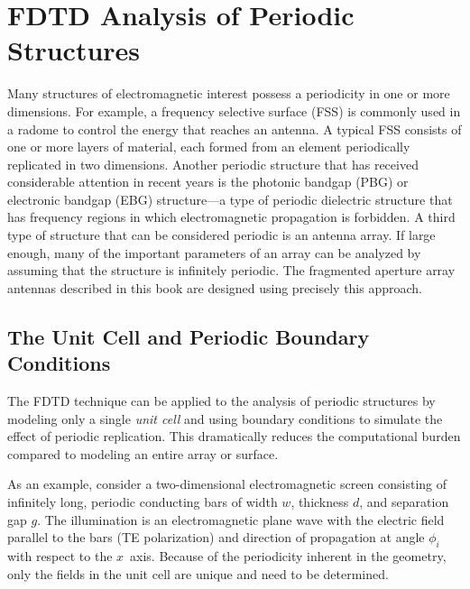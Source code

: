 \section{FDTD Analysis of Periodic Structures}
\label{sec:FDTD_PBC}

Many structures of electromagnetic interest possess a periodicity in one or more dimensions.  For example, a frequency selective surface (FSS) is commonly used in a radome to control the energy that reaches an antenna.  A typical FSS consists of one or more layers of material, each formed from an element periodically replicated in two dimensions.  Another periodic structure that has received considerable attention in recent years is the photonic bandgap (PBG) or electronic bandgap (EBG) structure---a type of periodic dielectric structure that has frequency regions in which electromagnetic propagation is forbidden.  A third type of structure that can be considered periodic is an antenna array.  If large enough, many of the important parameters of an array can be analyzed by assuming that the structure is infinitely periodic.  The fragmented aperture array antennas described in this book are designed using precisely this approach.

\subsection{The Unit Cell and Periodic Boundary Conditions}

The FDTD technique can be applied to the analysis of periodic structures by modeling only a single \emph{unit cell} and using boundary conditions to simulate the effect of periodic replication.  This dramatically reduces the computational burden compared to modeling an entire array or surface.

As an example, consider a two-dimensional electromagnetic screen consisting of infinitely long, periodic conducting bars of width $w$, thickness $d$, and separation gap $g$.  The illumination is an electromagnetic plane wave with the electric field parallel to the bars (TE polarization) and direction of propagation at angle $\phi_i$ with respect to the $x$~axis.  Because of the periodicity inherent in the geometry, only the fields in the unit cell are unique and need to be determined.

